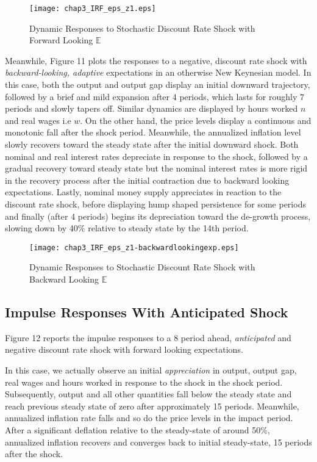 \documentclass[12pt]{article}
\newcommand{\1}{\mathbbm 1}
\begin{document}
	
	
	\begin{figure}[H]
		\begin{center}
			\texttt{[image: chap3\_IRF\_eps\_z1.eps]}
		\end{center}
		\caption{Dynamic Responses to Stochastic Discount Rate Shock with Forward Looking $\mathbb{E}$}
	\end{figure}


Meanwhile, Figure 11 plots the responses to a negative, discount rate shock with \textit{backward-looking, adaptive} expectations in an otherwise New Keynesian model. In this case, both the output and output gap display an initial downward trajectory, followed by a brief and mild expansion after 4 periods, which lasts for roughly 7 periods and slowly tapers off. Similar dynamics are displayed by hours worked $n$ and real wages i.e $w$. On the other hand, the price levels display a continuous and monotonic fall after the shock period. Meanwhile, the annualized inflation level slowly recovers toward the steady state after the initial downward shock. Both nominal and real interest rates depreciate in response to the shock, followed by a gradual recovery toward steady state but the nominal interest rates is more rigid in the recovery process after the initial contraction due to backward looking expectations. Lastly, nominal money supply appreciates in reaction to the discount rate shock, before displaying hump shaped persistence for some periods and finally (after 4 periods) begins its depreciation toward the de-growth process, slowing down by 40\% relative to steady state by the 14th period.


\begin{figure}[H]
	\begin{center}
		\texttt{[image: chap3\_IRF\_eps\_z1-backwardlookingexp.eps]}
	\end{center}
	\caption{Dynamic Responses to Stochastic Discount Rate Shock with Backward Looking $\mathbb{E}$}
\end{figure}

\subsection{Impulse Responses With Anticipated Shock}

Figure 12 reports the impulse responses to a 8 period ahead, \textit{anticipated} and negative discount rate shock with forward looking expectations. 

In this case, we actually observe an initial \textit{appreciation} in output, output gap, real wages and hours worked in response to the shock in the shock period. Subsequently, output and all other quantities fall below the steady state and reach previous steady state of zero after approximately 15 periods. Meanwhile, annualized inflation rate falls and so do the price levels in the impact period. After a significant deflation relative to the steady-state of around 50\%, annualized inflation recovers and converges back to initial steady-state, 15 periods after the shock.  
\end{document}
